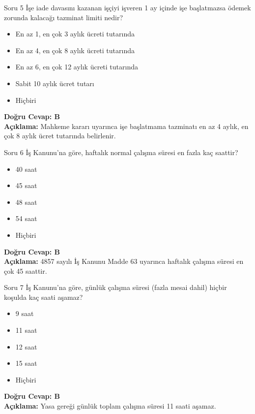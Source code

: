 \documentclass[12pt,a4paper]{article}
\begin{document}
\begin{testcard}{Soru 5}
    İşe iade davasını kazanan işçiyi işveren 1 ay içinde işe başlatmazsa ödemek zorunda kalacağı tazminat limiti nedir?
    \begin{itemize}
        \item[A)] En az 1, en çok 3 aylık ücreti tutarında
        \item[B)] En az 4, en çok 8 aylık ücreti tutarında
        \item[C)] En az 6, en çok 12 aylık ücreti tutarında
        \item[D)] Sabit 10 aylık ücret tutarı
        \item[E)] Hiçbiri
    \end{itemize}
    \tcblower
    \textbf{Doğru Cevap: B} \\
    \textbf{Açıklama:} Mahkeme kararı uyarınca işe başlatmama tazminatı en az 4 aylık, en çok 8 aylık ücret tutarında belirlenir.
\end{testcard}

\begin{testcard}{Soru 6}
    İş Kanunu'na göre, haftalık normal çalışma süresi en fazla kaç saattir?
    \begin{itemize}
        \item[A)] 40 saat
        \item[B)] 45 saat
        \item[C)] 48 saat
        \item[D)] 54 saat
        \item[E)] Hiçbiri
    \end{itemize}
    \tcblower
    \textbf{Doğru Cevap: B} \\
    \textbf{Açıklama:} 4857 sayılı İş Kanunu Madde 63 uyarınca haftalık çalışma süresi en çok 45 saattir.
\end{testcard}

\begin{testcard}{Soru 7}
    İş Kanunu'na göre, günlük çalışma süresi (fazla mesai dahil) hiçbir koşulda kaç saati aşamaz?
    \begin{itemize}
        \item[A)] 9 saat
        \item[B)] 11 saat
        \item[C)] 12 saat
        \item[D)] 15 saat
        \item[E)] Hiçbiri
    \end{itemize}
    \tcblower
    \textbf{Doğru Cevap: B} \\
    \textbf{Açıklama:} Yasa gereği günlük toplam çalışma süresi 11 saati aşamaz.
\end{testcard}
\end{document}
